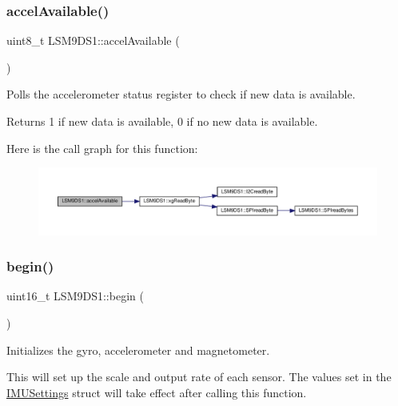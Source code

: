\subsubsection{\texorpdfstring{accel\+Available()}{accelAvailable()}}
{\footnotesize\ttfamily uint8\+\_\+t L\+S\+M9\+D\+S1\+::accel\+Available (\begin{DoxyParamCaption}{ }\end{DoxyParamCaption})}



Polls the accelerometer status register to check if new data is available. 

\begin{DoxyReturn}{Returns}
1 if new data is available, 0 if no new data is available. 
\end{DoxyReturn}
Here is the call graph for this function\+:\nopagebreak
\begin{figure}[H]
\begin{center}
\leavevmode
\includegraphics[width=350pt]{classLSM9DS1_a515ce6f5c199a86c6aa5be353b2a3a13_cgraph}
\end{center}
\end{figure}
\mbox{\label{classLSM9DS1_a8728e560c76bd120b3711af15a6ecbd6}} 
\subsubsection{\texorpdfstring{begin()}{begin()}}
{\footnotesize\ttfamily uint16\+\_\+t L\+S\+M9\+D\+S1\+::begin (\begin{DoxyParamCaption}{ }\end{DoxyParamCaption})}



Initializes the gyro, accelerometer and magnetometer. 

This will set up the scale and output rate of each sensor. The values set in the \hyperlink{structIMUSettings}{I\+M\+U\+Settings} struct will take effect after calling this function.

